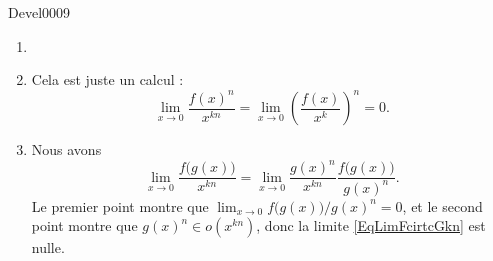 
\begin{corrige}{Devel0009}

\begin{enumerate}

\item
\item
Cela est juste un calcul :
\begin{equation}
	\lim_{x\to 0} \frac{ f(x)^n }{ x^{kn} }=\lim_{x\to 0} \left( \frac{ f(x) }{ x^k } \right)^n=0.
\end{equation}

\item
Nous avons
\begin{equation}		\label{EqLimFcirtcGkn}
	\lim_{x\to 0} \frac{ f\big( g(x) \big) }{ x^{kn} }=\lim_{x\to 0} \frac{ g(x)^n }{ x^{kn} }\frac{ f\big( g(x) \big) }{ g(x)^n }.
\end{equation}
Le premier point montre que $\lim_{x\to 0} f\big( g(x) \big)/g(x)^n=0$, et le second point montre que $g(x)^n\in o(x^{kn})$, donc la limite \eqref{EqLimFcirtcGkn} est nulle.

\end{enumerate}

\end{corrige}
